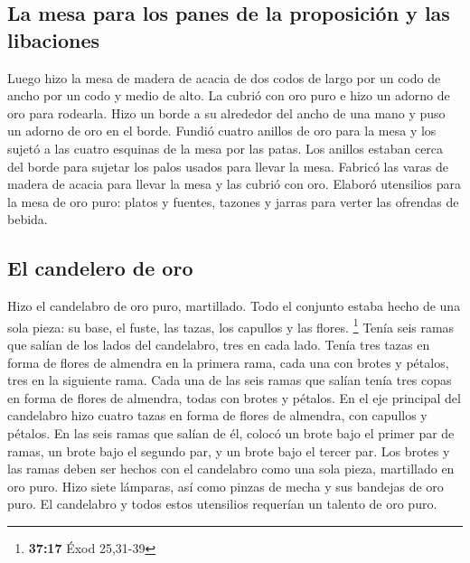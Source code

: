 \hypertarget{la-mesa-para-los-panes-de-la-proposiciuxf3n-y-las-libaciones}{%
\subsection{La mesa para los panes de la proposición y las
libaciones}\label{la-mesa-para-los-panes-de-la-proposiciuxf3n-y-las-libaciones}}

 Luego hizo la mesa de madera de acacia de dos codos de
largo por un codo de ancho por un codo y medio de alto. 
La cubrió con oro puro e hizo un adorno de oro para rodearla.
 Hizo un borde a su alrededor del ancho de una mano y
puso un adorno de oro en el borde.  Fundió cuatro anillos
de oro para la mesa y los sujetó a las cuatro esquinas de la mesa por
las patas.  Los anillos estaban cerca del borde para
sujetar los palos usados para llevar la mesa.  Fabricó
las varas de madera de acacia para llevar la mesa y las cubrió con oro.
 Elaboró utensilios para la mesa de oro puro: platos y
fuentes, tazones y jarras para verter las ofrendas de bebida.

\hypertarget{el-candelero-de-oro}{%
\subsection{El candelero de oro}\label{el-candelero-de-oro}}

 Hizo el candelabro de oro puro, martillado. Todo el
conjunto estaba hecho de una sola pieza: su base, el fuste, las tazas,
los capullos y las flores. \footnote{\textbf{37:17} Éxod 25,31-39}
 Tenía seis ramas que salían de los lados del candelabro,
tres en cada lado. Tenía tres tazas en forma de flores de almendra en la
primera rama, cada una con brotes y pétalos, tres en la siguiente rama.
 Cada una de las seis ramas que salían tenía tres copas
en forma de flores de almendra, todas con brotes y pétalos.
 En el eje principal del candelabro hizo cuatro tazas en
forma de flores de almendra, con capullos y pétalos.  En
las seis ramas que salían de él, colocó un brote bajo el primer par de
ramas, un brote bajo el segundo par, y un brote bajo el tercer par.
 Los brotes y las ramas deben ser hechos con el
candelabro como una sola pieza, martillado en oro puro. 
Hizo siete lámparas, así como pinzas de mecha y sus bandejas de oro
puro.  El candelabro y todos estos utensilios requerían
un talento de oro puro.

